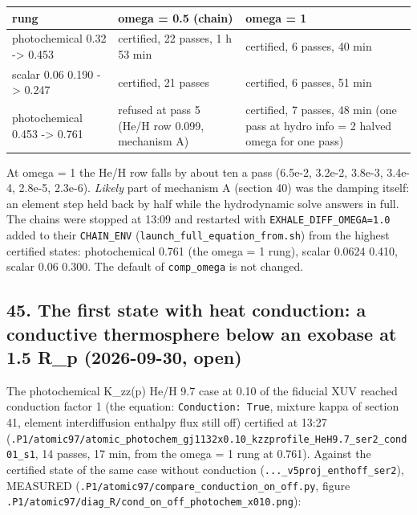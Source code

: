 \documentclass[english,a4paper]{my_memo}
\begin{document}
{\def\LTcaptype{none} %
{\small
\begin{longtable}[]{@{}lll@{}}
\toprule\noalign{}
rung & omega = 0.5 (chain) & omega = 1 \\
\midrule\noalign{}
\endhead
\bottomrule\noalign{}
\endlastfoot
photochemical 0.32 -\textgreater{} 0.453 & certified, 22 passes, 1 h 53 min & certified, 6 passes, 40 min \\
scalar 0.06 0.190 -\textgreater{} 0.247 & certified, 21 passes & certified, 6 passes, 51 min \\
photochemical 0.453 -\textgreater{} 0.761 & refused at pass 5 (He/H row 0.099, mechanism A) & certified, 7 passes, 48 min (one pass at hydro info = 2 halved omega for one pass) \\
\end{longtable}
}
}

At omega = 1 the He/H row falls by about ten a pass (6.5e-2, 3.2e-2,
3.8e-3, 3.4e-4, 2.8e-5, 2.3e-6). \emph{Likely} part of mechanism A (section 40)
was the damping itself: an element step held back by half while the
hydrodynamic solve answers in full. The chains were stopped at 13:09 and
restarted with \texttt{EXHALE\_DIFF\_OMEGA=1.0} added to their \texttt{CHAIN\_ENV}
(\texttt{launch\_full\_equation\_from.sh}) from the highest certified states:
photochemical 0.761 (the omega = 1 rung), scalar 0.0624 0.410, scalar 0.06
0.300. The default of \texttt{comp\_omega} is not changed.

\subsection{45. The first state with heat conduction: a conductive thermosphere below an exobase at 1.5 R\_p (2026-09-30, open)}\label{45-the-first-state-with-heat-conduction-a-conductive-thermosphere-below-an-exobase-at-15-r_p-2026-09-30-open}

The photochemical K\_zz(p) He/H 9.7 case at 0.10 of the fiducial XUV reached
conduction factor 1 (the equation: \texttt{Conduction:\ True}, mixture kappa of
section 41, element interdiffusion enthalpy flux still off) certified at
13:27 (\texttt{.P1/atomic97/atomic\_photochem\_gj1132x0.10\_kzzprofile\_HeH9.7\_ser2\_cond01\_s1},
14 passes, 17 min, from the omega = 1 rung at 0.761). Against the certified
state of the same case without conduction
(\texttt{...\_v5proj\_enthoff\_ser2}), MEASURED (\texttt{.P1/atomic97/compare\_conduction\_on\_off.py},
figure \texttt{.P1/atomic97/diag\_R/cond\_on\_off\_photochem\_x010.png}):
\end{document}

